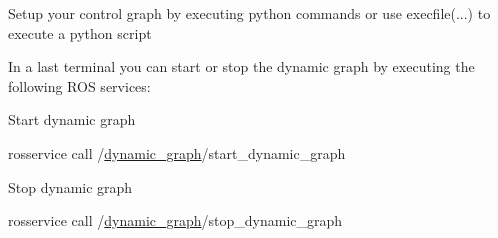 \begin{DoxyEnumerate}
\begin{DoxyEnumerate}
\item Setup your control graph by executing python commands or use {\ttfamily execfile(...)} to execute a python script
\item In a last terminal you can start or stop the dynamic graph by executing the following R\+OS services\+:
\item Start dynamic graph 
\begin{DoxyCode}
rosservice call /\hyperlink{namespacedynamic__graph}{dynamic\_graph}/start\_dynamic\_graph
\end{DoxyCode}

\item Stop dynamic graph 
\begin{DoxyCode}
rosservice call /\hyperlink{namespacedynamic__graph}{dynamic\_graph}/stop\_dynamic\_graph
\end{DoxyCode}
 
\end{DoxyEnumerate}
\end{DoxyEnumerate}
